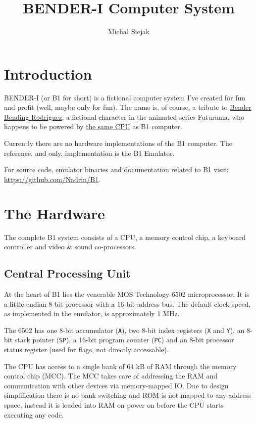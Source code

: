 \documentclass[a4paper,10pt,oneside]{article}
\begin{document}
\title{BENDER-I Computer System}
\author{Michał Siejak}
\date{}

\maketitle
\tableofcontents
\newpage

\section{Introduction}
BENDER-I (or B1 for short) is a fictional computer system I've created for fun and profit (well, maybe only for fun). The name is, of course, a tribute to \href{http://en.wikipedia.org/wiki/Bender_(Futurama)}{Bender Bending Rodríguez}, a fictional character in the animated series Futurama, who happens to be powered by \href{https://www.google.com/webhp?hl=en#hl=en&q=bender+6502}{the same CPU} as B1 computer. 

Currently there are no hardware implementations of the B1 computer. The reference, and only, implementation is the B1 Emulator.

For source code, emulator binaries and documentation related to B1 visit: \url{https://github.com/Nadrin/B1}.

\section{The Hardware}
The complete B1 system consists of a CPU, a memory control chip, a keyboard controller and video \& sound co-processors.

\subsection{Central Processing Unit}
At the heart of B1 lies the venerable MOS Technology 6502 microprocessor. It is a little-endian 8-bit processor with a 16-bit address bus. The default clock speed, as implemented in the emulator, is approximately 1 MHz.

The 6502 has one 8-bit accumulator (\texttt{A}), two 8-bit index registers (\texttt{X} and \texttt{Y}), an 8-bit stack pointer (\texttt{SP}), a 16-bit program counter (\texttt{PC}) and an 8-bit processor status register (used for flags, not directly accessable).

The CPU has access to a single bank of 64 kB of RAM through the memory control chip (MCC). The MCC takes care of addressing the RAM and communication with other devices via memory-mapped IO. Due to design simplification there is no bank switching and ROM is not mapped to any address space, instead it is loaded into RAM on power-on before the CPU starts executing any code.
\end{document}
